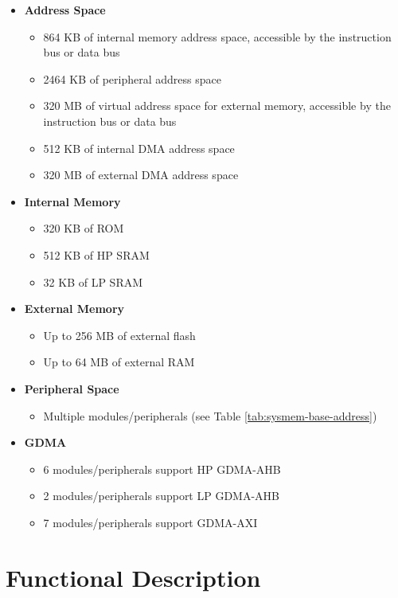 \documentclass[main\_\_EN.tex]{subfiles}
\begin{document}
\begin{itemize}
    \item {\bfseries Address Space}
        \begin{itemize}
    	    \item 864 KB of internal memory address space, accessible by the instruction bus or data bus
    	    \item 2464 KB of peripheral address space
    	    \item 320 MB of virtual address space for external memory, accessible by the instruction bus or data bus
    	    \item 512 KB of internal DMA address space
                \item 320 MB of external DMA address space
        \end{itemize}
    \item {\bfseries Internal Memory}
        \begin{itemize}
            \item 320 KB of ROM
	        \item 512 KB of HP SRAM
	        \item 32 KB of LP SRAM
	    \end{itemize}
    \item {\bfseries External Memory}
        \begin{itemize}
            \item Up to 256 MB of external flash
            \item Up to 64 MB of external RAM
	    \end{itemize}
    \item \textbf{Peripheral Space}
        \begin{itemize}
           \item Multiple modules/peripherals (see Table \ref{tab:sysmem-base-address})
        \end{itemize}
    \item {\bfseries GDMA}
        \begin{itemize}
            \item 6 modules/peripherals support HP GDMA-AHB
            \item 2 modules/peripherals support LP GDMA-AHB
            \item 7 modules/peripherals support GDMA-AXI
        \end{itemize}
\end{itemize}

\section{Functional Description}
\end{document}
